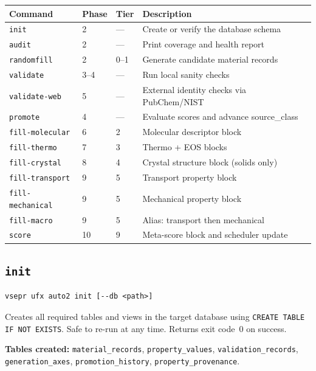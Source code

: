 \documentclass[11pt,letterpaper]{article}
\begin{document}
\begin{longtable}{lllp{6cm}}
\toprule
Command & Phase & Tier & Description \\
\midrule
\texttt{init}            & 2   & ---  & Create or verify the database schema \\
\texttt{audit}           & 2   & ---  & Print coverage and health report \\
\texttt{randomfill}      & 2   & 0--1 & Generate candidate material records \\
\texttt{validate}        & 3--4& ---  & Run local sanity checks \\
\texttt{validate-web}    & 5   & ---  & External identity checks via PubChem/NIST \\
\texttt{promote}         & 4   & ---  & Evaluate scores and advance source\_class \\
\texttt{fill-molecular}  & 6   & 2    & Molecular descriptor block \\
\texttt{fill-thermo}     & 7   & 3    & Thermo + EOS blocks \\
\texttt{fill-crystal}    & 8   & 4    & Crystal structure block (solids only) \\
\texttt{fill-transport}  & 9   & 5    & Transport property block \\
\texttt{fill-mechanical} & 9   & 5    & Mechanical property block \\
\texttt{fill-macro}      & 9   & 5    & Alias: transport then mechanical \\
\texttt{score}           & 10  & 9    & Meta-score block and scheduler update \\
\bottomrule
\end{longtable}

\subsection{\texttt{init}}

\begin{lstlisting}
vsepr ufx auto2 init [--db <path>]
\end{lstlisting}

Creates all required tables and views in the target database using
\texttt{CREATE TABLE IF NOT EXISTS}.  Safe to re-run at any time.
Returns exit code~0 on success.

\textbf{Tables created:}
\texttt{material\_records}, \texttt{property\_values},
\texttt{validation\_records}, \texttt{generation\_axes},
\texttt{promotion\_history}, \texttt{property\_provenance}.
\end{document}
